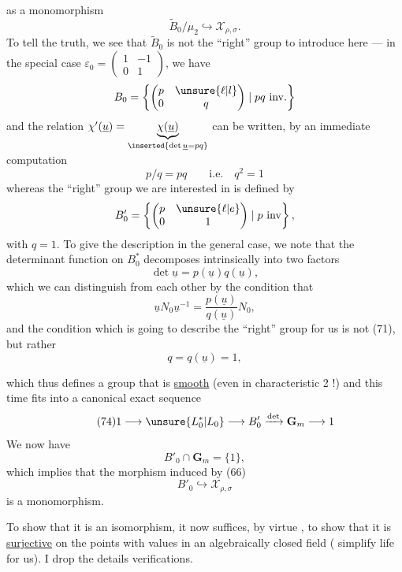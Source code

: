 as a monomorphism
\[
\tag{70}
\widetilde B_0/\mu_2\hookrightarrow\mathcal X_{\rho,\sigma}.
\]
To tell the truth, we see that $\widetilde B_0$ is not the ``right'' group to introduce here --- in the special case $\varepsilon_0=\begin{pmatrix}1&-1\\0&1\end{pmatrix}$,  we have
\[
B_0=\left\{\begin{pmatrix}p&\unsure{\ell|l}\\0&q\end{pmatrix}\mid pq\ \mathrm{inv.}\right\}
\]
and the relation  $\chi'(\underline u)=\underbrace{\chi(\underline u)}_{\inserted{\det\underline u=pq}}$ can be written, by an immediate computation
\[
\tag{71}
p/q=pq\qquad\mathrm{i.e.}\quad q^2=1
\]
whereas the ``right'' group we are interested in is defined by
\[
B'_0=\left\{\begin{pmatrix}p&\unsure{\ell|e}\\0&1\end{pmatrix}\mid p\ \mathrm{inv}\right\},
\]
 with $q=1$. To give the description in the general case, we note that the determinant function on $B_0^*$ decomposes intrinsically into two factors
\[
\tag{72}
\det\underline u=p(\underline u)q(\underline u),
\]
which we can distinguish from each other  by the condition that
\[
\tag{73}
\underline uN_0\underline u^{-1}=\frac{p(\underline u)}{q(\underline u)}N_0,
\]
and the condition which is going to describe the ``right'' group for us is not (71), but rather
\[
\tag{74}
q=q(\underline u)=1,
\]


which thus defines a group that is \uline{smooth} (even in characteristic 2 !) and this time fits into a canonical exact sequence
\[
\tag{74}
1\longrightarrow\unsure{L_0^*|L_0}\longrightarrow B'_0\xrightarrow{\det}\mathbf G_m\longrightarrow1
\]
We now have
\[
\tag{75}
B'_0\cap\mathbf G_m=\{1\},
\]
which implies that the morphism induced by (66)
\[
\tag{76}
B'_0\hookrightarrow\mathcal X_{\rho,\sigma}
\]
is a monomorphism.

To show that it is an isomorphism, it now suffices, by virtue , to show that it is \uline{surjective} on the points with values in an algebraically closed field (  simplify life for us). I drop the details  verifications.


